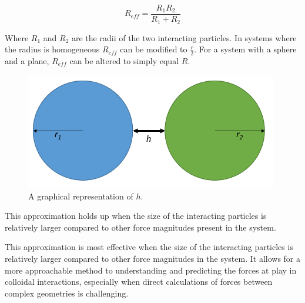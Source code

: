 \begin{equation} %
R_{eff} = \frac{R_1R_2}{R_1 + R_2}
\end{equation}

Where $R_1$ and $R_2$ are the radii of the two interacting particles. In systems where the radius is homogeneous $R_{eff}$ can be modified to $\frac{r}{2}$. For a system with a sphere and a plane, $R_{eff}$ can be altered to simply equal $R$.

\begin{figure}[h]     %
        \begin{center}
          \includegraphics[width=110mm]{chapter1/h_graph.PNG}
\end{center}
\caption{A graphical representation of $h$.}
\label{fig:h_graph}                 %
\end{figure}

This approximation holds up when the size of the interacting particles is relatively larger compared to other force magnitudes present in the system. 

This approximation is most effective when the size of the interacting particles is relatively larger compared to other force magnitudes in the system. It allows for a more approachable method to understanding and predicting the forces at play in colloidal interactions, especially when direct calculations of forces between complex geometries is challenging. \cite{smolBook1} \cite{Origin2V} \cite{IsGreenBook} \cite{surfpattQ}\cite{Surfquestion} %




